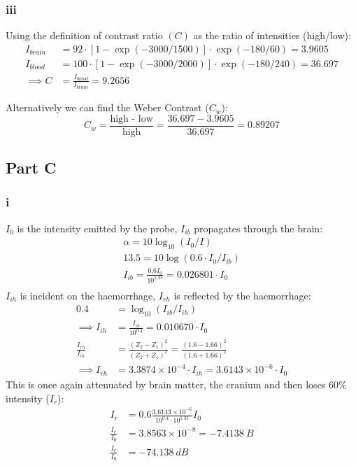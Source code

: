 \subsubsection*{iii}
Using the definition of contrast ratio $(C)$ as the ratio of intensities (high/low):
\begin{equation*}\begin{split}
    I_{brain} &= 92\cdot[1-\exp(-3000/1500)]\cdot \exp(-180/60) = 3.9605 \\
    I_{blood} &= 100\cdot[1-\exp(-3000/2000)]\cdot \exp(-180/240) = 36.697 \\
    \implies C &= \frac{I_{blood}}{I_{brain}} = 9.2656
\end{split}
\end{equation*}

Alternatively we can find the Weber Contrast ($C_w$):
\begin{equation*}
    C_w = \frac{\text{high - low}}{\text{high}} = \frac{36.697 - 3.9605}{36.697} = 0.89207
\end{equation*}

\subsection*{Part C}
\subsubsection*{i}
$I_0$ is the intensity emitted by the probe, $I_{ib}$ propagates through the brain:
\begin{equation}
    \begin{split}
        \alpha = 10 \log_{10} (I_0/I) \\
        13.5 = 10 \log(0.6\cdot I_0/I_{ib}) \\
        I_{ib} = \frac{0.6 I_0}{10^{1.35}} = 0.026801 \cdot I_0 \\
    \end{split}
\end{equation}
$I_{ih}$ is incident on the haemorrhage, $I_{rh}$ is reflected by the haemorrhage:
\begin{equation}\begin{split}
    0.4 &= \log_{10} (I_{ib}/I_{ih})\\
    \implies I_{ih} &= \frac{I_{ib}}{ 10^{0.4} } = 0.010670 \cdot I_0\\
    \frac{I_{rh}}{I_{ih}} &= \frac{{(Z_2-Z_1)}^2}{{(Z_2+Z_1)}^2} = \frac{{(1.6-1.66)}^2}{{(1.6+1.66)}^2} \\
    \implies I_{rh} &= 3.3874 \times 10^{-4} \cdot I_{ih} = 3.6143 \times 10^{-6} \cdot I_0
\end{split}
\end{equation}
This is once again attenuated by brain matter, the cranium and then loses 60\% intensity ($I_r$):
\begin{equation*}
\begin{split}
    I_{r} &= 0.6 \frac{3.6143 \times 10^{-6} }{10^{0.4}\cdot 10^{1.35}} I_0 \\
    \frac{I_r}{I_0} &= 3.8563 \times 10^{-8} = -\SI{7.4138}{B}\\
    \frac{I_r}{I_0} &= -\SI{74.138}{dB} 
\end{split}
\end{equation*}
